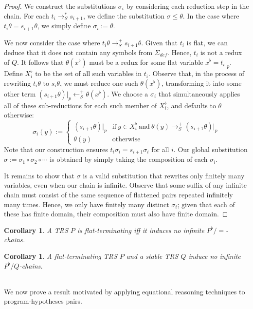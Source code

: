 \documentclass{article}
\newtheorem{corollary}[theorem]{Corollary}
\begin{document}
\begin{proof}
    We construct the substitutions $\sigma_i$ by considering each reduction step in the chain. For each $t_i \rightarrow^*_S s_{i+1}$, we define the substitution $\sigma \leq \theta$.  In the case where $t_i\theta = s_{i+1}\theta$, we simply define $\sigma_i := \theta$. 
    
    We now consider the case where $t_i \theta \rightarrow^+_S s_{i+1} \theta$. Given that $t_i$ is flat, we can deduce that it does not contain any symbols from $\Sigma_{def}$. Hence, $t_i$ is not a redux of $Q$. It follows that $\theta(x^\flat)$ must be a redux for some flat variable $x^\flat = t_i |_p$. Define $X_i^\flat$ to be the set of all such variables in $t_i$. Observe that, in the process of rewriting $t_i\theta$ to $s_i\theta$, we must reduce one such $\theta(x^\flat)$, transforming it into some other term $(s_{i+1} \theta)|_p \leftarrow^+_S \theta(x^\flat)$. We choose a $\sigma_i$ that simultaneously applies all of these sub-reductions for each such member of $X_i^\flat$, and defaults to $\theta$ otherwise: 
    $$\sigma_i(y) := \begin{cases}
        (s_{i+1} \theta)|_p  &\text{if}~ y \in X_i^\flat ~\text{and}~ \theta(y) \rightarrow^+_S (s_{i+1}\theta)|_p \\
        \theta(y) &\text{otherwise}
    \end{cases}$$
    Note that our construction ensures $t_i\sigma_i = s_{i+1}\sigma_i$ for all $i$. Our global substitution $\sigma := \sigma_1 \circ \sigma_2 \circ \cdots$ is obtained by simply taking the composition of each $\sigma_i$. 
    
    It remains to show that $\sigma$ is a valid substitution that rewrites only finitely many variables, even when our chain is infinite. Observe that some suffix of any infinite chain must consist of the same sequence of flattened pairs repeated infinitely many times. Hence, we only have finitely many distinct $\sigma_i$; given that each of these has finite domain, their composition must also have finite domain. 
\end{proof}

\begin{corollary} \label{thm:flat_chain_equality}
    A TRS $P$ is flat-terminating iff it induces no infinite $P^\flat/\!\!=$-chains.  
\end{corollary}

\begin{corollary} \label{thm:flat_term_stable}
    A flat-terminating TRS $P$ and a stable TRS $Q$ induce no infinite $P^\flat/Q$-chains.
\end{corollary}
~\\
We now prove a result motivated by applying equational reasoning techniques to program-hypotheses pairs. 
\end{document}
